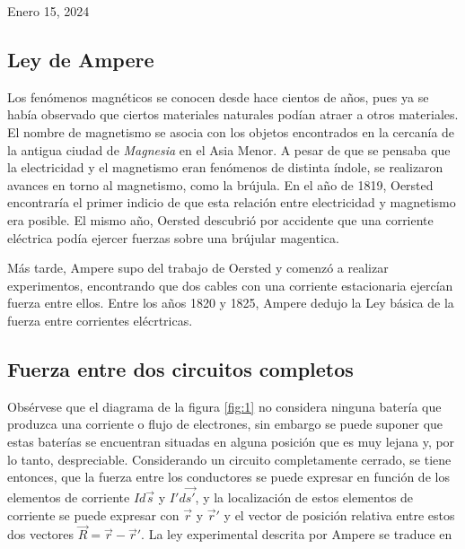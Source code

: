 \documentclass{article}
\begin{document}
{Enero 15, 2024}
\tableofcontents
\begin{multicols}{2}

\section{Ley de Ampere}
Los fenómenos magnéticos se conocen desde hace cientos de años, pues ya se había observado que ciertos materiales naturales podían atraer a otros materiales. El nombre de magnetismo se asocia con los objetos encontrados en la cercanía de la antigua ciudad de \emph{Magnesia} en el Asia Menor. A pesar de que se pensaba que la electricidad y el magnetismo eran fenómenos de distinta índole, se realizaron avances en torno al magnetismo, como la brújula. En el año de 1819, Oersted encontraría el primer indicio de que esta relación entre electricidad y magnetismo era posible. El mismo año, Oersted descubrió por accidente que una corriente eléctrica podía ejercer fuerzas sobre una brújular magentica. 


Más tarde, Ampere supo del trabajo de Oersted y comenzó a realizar experimentos, encontrando que dos cables con una corriente estacionaria ejercían fuerza entre ellos. Entre los años 1820 y 1825, Ampere dedujo la Ley básica de la fuerza entre corrientes elécrtricas.

\subsection{Fuerza entre dos circuitos completos}

Obsérvese que el diagrama de la figura \ref{fig:1} no considera ninguna batería que produzca una corriente o flujo de electrones, sin embargo se puede suponer que estas baterías se encuentran situadas en alguna posición que es muy lejana y, por lo tanto, despreciable. Considerando un circuito completamente cerrado, se tiene entonces, que la fuerza entre los conductores se puede expresar en función de los elementos de corriente $Id\vec{s}$ y $I'd\vec{s'}$, y la localización de estos elementos de corriente se puede expresar con $\vec{r}$ y $\vec{r}'$ y el vector de posición relativa entre estos dos vectores $\vec{R} = \vec{r} - \vec{r}'$. La ley experimental descrita por Ampere se traduce en


\end{multicols}
\end{document}
